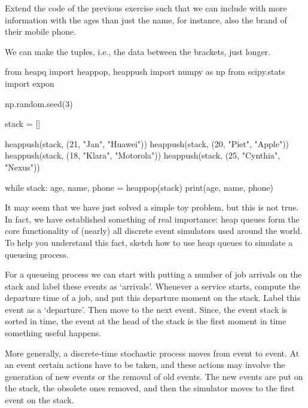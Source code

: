 \documentclass{scrartcl}
\begin{document}
\begin{exercise}
  Extend the code of the previous exercise such that we can include  with more information with the ages than just the name, for instance, also the brand of their mobile phone. 
\begin{solution}
We can make the  tuples, i.e., the data between the brackets,  just longer. 

\begin{pyblock}
from heapq import heappop, heappush
import numpy as np 
from scipy.stats import  expon

np.random.seed(3)

stack = []

heappush(stack, (21, "Jan", "Huawei"))
heappush(stack, (20, "Piet", "Apple"))
heappush(stack, (18, "Klara", "Motorola"))
heappush(stack, (25, "Cynthia", "Nexus"))

while stack:
    age, name, phone = heappop(stack)
    print(age, name, phone)

\end{pyblock}


\end{solution}
\end{exercise}


\begin{exercise}
  It may seem that we have just solved a simple toy problem, but this is not true. In fact, we have established something of real importance: heap queues form the core functionality of (nearly) all discrete event simulators used around the world.  To help you understand this fact, sketch how to use heap queues  to simulate a queueing process. 
  \begin{solution}
    For a queueing process we can start with putting a number of job arrivals on the stack and label these events as `arrivals'. Whenever a service starts, compute the departure time of a job, and put this departure moment on the stack. Label this event as a `departure'. Then move to the next event. Since, the event stack is sorted in time, the event at the head of the stack is the first moment in time something useful happens. 

More generally, a discrete-time stochastic process moves from event to event. At an event certain actions have to be taken, and these actions may involve the generation of new events or the removal of old events. The new events are put on the stack, the obsolete ones removed, and then the simulator moves to the first event on the stack. 
  \end{solution}
\end{exercise}
\end{document}
